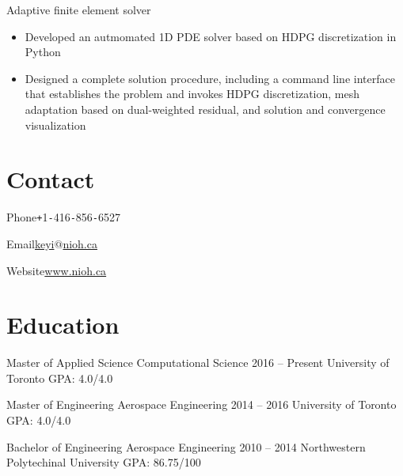 \documentclass{tccv}
\begin{document}
\begin{eventlist}
  {Adaptive finite element solver}
  \begin{itemize}
    \item Developed an autmomated 1D PDE solver based on HDPG discretization in Python
    \item Designed a complete solution procedure, including a command line interface that establishes the problem and invokes HDPG discretization, mesh adaptation based on dual-weighted residual, and solution and convergence visualization
  \end{itemize}

  

  


\end{eventlist}
\needspace{0.5\textheight}
\section{Contact}
\begin{factlist}
  \item{Phone}{\texttt{+}1\texttt{-}416\texttt{-}856\texttt{-}6527}
  \item{Email}{\href{mailto:keyi@nioh.ca}{keyi$@$nioh.ca}}
  \item{Website}{\href{https://nioh.ca}{www.nioh.ca}}
\end{factlist}

\section{Education}
\begin{yearlist}
  \item[Master of Applied Science \newline Computational Science]{2016 -- Present}
  {University of Toronto}
  {GPA: 4.0/4.0}
  \item[Master of Engineering \newline Aerospace Engineering]{2014 -- 2016}
  {University of Toronto}
  {GPA: 4.0/4.0}
  \item[Bachelor of Engineering \newline Aerospace Engineering]{2010 -- 2014}
  {Northwestern Polytechinal University}
  {GPA: 86.75/100}
\end{yearlist}
\end{document}
